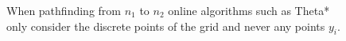 
%    
\begin{figure}[tb]
  \begin{center}
    
  \end{center}
  \caption{When pathfinding from $n_1$ to $n_2$ online algorithms such as Theta* only consider the discrete points of 
the grid and never any points $y_i$. 
  }
  \label{fig::ex1}
\end{figure}

